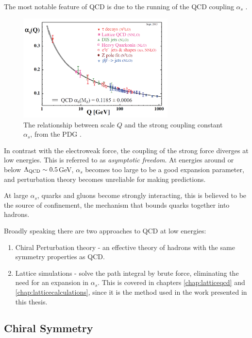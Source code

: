 The most notable feature of QCD is due to the running of the QCD coupling $\alpha_s$ \cite{PhysRevLett.30.1343}.
\begin{figure}
  \begin{center}
    \includegraphics[width=0.7\textwidth]{images/QCD-running-coupling.png}
  \end{center}
  \caption{The relationship between scale $Q$ and the strong coupling constant $\alpha_s$, from the PDG \cite{PhysRevD.98.030001}.}
  \label{fig:semileptonic}
\end{figure}
In contrast with the electroweak force, the coupling of the strong force diverges at low energies. This is referred to as {\it{asymptotic freedom}}. At energies around or below $\Lambda_{\text{QCD}} \sim 0.5$GeV, $\alpha_s$ becomes too large to be a good expansion parameter, and perturbation theory becomes unreliable for making predictions.

At large $\alpha_s$, quarks and gluons become strongly interacting, this is believed to be the source of confinement, the mechanism that bounds quarks together into hadrons. %

Broadly speaking there are two approaches to QCD at low energies:
\begin{enumerate}
\item
  Chiral Perturbation theory - an effective theory of hadrons with the same symmetry properties as QCD.
\item
  Lattice simulations - solve the path integral by brute force, eliminating the need for an expansion in $\alpha_s$. This is covered in chapters \ref{chap:latticeqcd} and \ref{chap:latticecalculations}, since it is the method used in the work presented in this thesis.
\end{enumerate}

\subsection{Chiral Symmetry}
\label{sec:chiralsymmetry}

